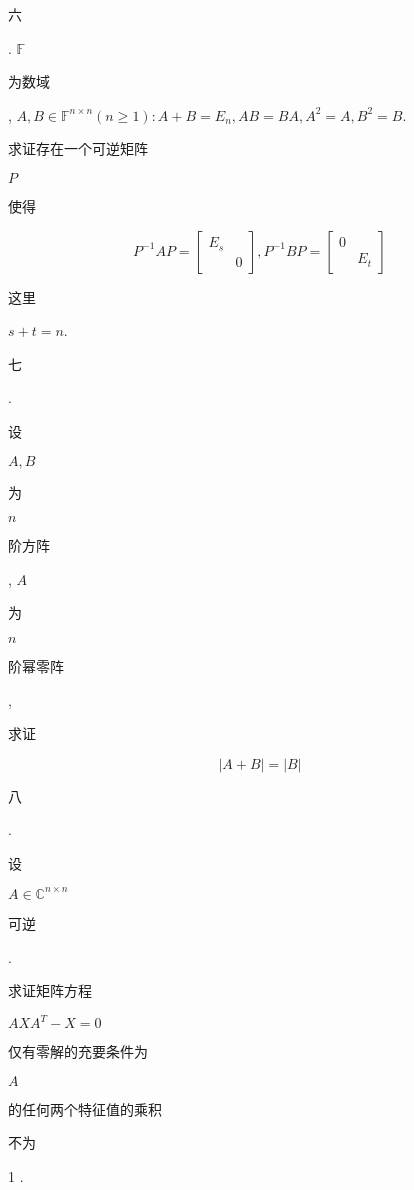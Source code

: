 \documentclass[10pt]{article}
\begin{document}
\begin{CJK}{UTF8}{mj}六\end{CJK}. $\mathbb{F}$ \begin{CJK}{UTF8}{mj}为数域\end{CJK}, $A, B \in \mathbb{F}^{n \times n}(n \geq 1): A+B=E_{n}, A B=B A, A^{2}=A, B^{2}=B$. \begin{CJK}{UTF8}{mj}求证存在一个可逆矩阵\end{CJK} $P$ \begin{CJK}{UTF8}{mj}使得\end{CJK}
$$
P^{-1} A P=\left[\begin{array}{cc}
E_{s} & \\
& 0
\end{array}\right], P^{-1} B P=\left[\begin{array}{cc}
0 & \\
& E_{t}
\end{array}\right]
$$
\begin{CJK}{UTF8}{mj}这里\end{CJK} $s+t=n$.

\begin{CJK}{UTF8}{mj}七\end{CJK}. \begin{CJK}{UTF8}{mj}设\end{CJK} $A, B$ \begin{CJK}{UTF8}{mj}为\end{CJK} $n$ \begin{CJK}{UTF8}{mj}阶方阵\end{CJK}, $A$ \begin{CJK}{UTF8}{mj}为\end{CJK} $n$ \begin{CJK}{UTF8}{mj}阶幂零阵\end{CJK}, \begin{CJK}{UTF8}{mj}求证\end{CJK}
$$
|A+B|=|B|
$$
\begin{CJK}{UTF8}{mj}八\end{CJK}. \begin{CJK}{UTF8}{mj}设\end{CJK} $A \in \mathbb{C}^{n \times n}$ \begin{CJK}{UTF8}{mj}可逆\end{CJK}. \begin{CJK}{UTF8}{mj}求证矩阵方程\end{CJK} $A X A^{T}-X=0$ \begin{CJK}{UTF8}{mj}仅有零解的充要条件为\end{CJK} $A$ \begin{CJK}{UTF8}{mj}的任何两个特征值的乘积\end{CJK} \begin{CJK}{UTF8}{mj}不为\end{CJK} 1 .
\end{document}
